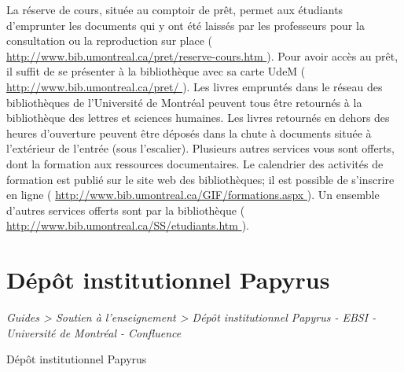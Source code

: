 \documentclass [12 pt]{article}
\begin{document}
            La réserve de cours, située au comptoir de prêt, permet aux étudiants d'emprunter les
                documents qui y ont été laissés par les professeurs pour la consultation ou la
                reproduction sur place (
        \href{
        http://www.bib.umontreal.ca/pret/reserve-cours.htm
        } {
        http://www.bib.umontreal.ca/pret/reserve-cours.htm
        }
    ). Pour avoir accès au
                prêt, il suffit de se présenter à la bibliothèque avec sa carte UdeM (
        \href{
        http://www.bib.umontreal.ca/pret/
        } {
        http://www.bib.umontreal.ca/pret/
        }
    ).
            Les livres empruntés dans le réseau des bibliothèques de l'Université de Montréal
                peuvent tous être retournés à la bibliothèque des lettres et sciences humaines. Les
                livres retournés en dehors des heures d'ouverture peuvent être déposés dans la chute
                à documents située à l'extérieur de l'entrée (sous l'escalier).
            Plusieurs autres services vous sont offerts, dont la formation aux ressources
                documentaires. Le calendrier des activités de formation est publié sur le site web
                des bibliothèques; il est possible de s'inscrire en ligne (
        \href{
        http://www.bib.umontreal.ca/GIF/formations.aspx
        } {
        http://www.bib.umontreal.ca/GIF/formations.aspx
        }
    ). Un ensemble
                d'autres services offerts sont par la bibliothèque (
        \href{
        http://www.bib.umontreal.ca/SS/etudiants.htm
        } {
        http://www.bib.umontreal.ca/SS/etudiants.htm
        }
    ).
        
    
    
        \newpage
        \section {
        Dépôt institutionnel Papyrus
        }
        
        
        
        \textit{
        Guides > Soutien à l'enseignement > Dépôt institutionnel Papyrus - EBSI -
            Université de Montréal - Confluence
        }
    
        Dépôt institutionnel Papyrus
        
\end{document}
